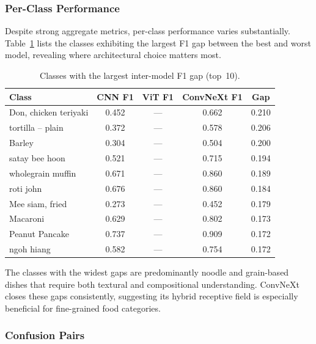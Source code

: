 \subsubsection{Per-Class Performance}\label{sec:per-class}

Despite strong aggregate metrics, per-class performance varies
substantially.  Table~\ref{tab:f1-gap} lists the classes exhibiting the
largest F1 gap between the best and worst model, revealing where
architectural choice matters most.

\begin{table}[ht]
\centering
\caption{Classes with the largest inter-model F1 gap (top~10).}
\label{tab:f1-gap}
\begin{tabular}{lcccc}
\toprule
\textbf{Class} & \textbf{CNN F1} & \textbf{ViT F1} & \textbf{ConvNeXt F1} & \textbf{Gap} \\
\midrule
Don, chicken teriyaki & 0.452 & ---   & 0.662 & 0.210 \\
tortilla -- plain     & 0.372 & ---   & 0.578 & 0.206 \\
Barley                & 0.304 & ---   & 0.504 & 0.200 \\
satay bee hoon        & 0.521 & ---   & 0.715 & 0.194 \\
wholegrain muffin     & 0.671 & ---   & 0.860 & 0.189 \\
roti john             & 0.676 & ---   & 0.860 & 0.184 \\
Mee siam, fried       & 0.273 & ---   & 0.452 & 0.179 \\
Macaroni              & 0.629 & ---   & 0.802 & 0.173 \\
Peanut Pancake        & 0.737 & ---   & 0.909 & 0.172 \\
ngoh hiang            & 0.582 & ---   & 0.754 & 0.172 \\
\bottomrule
\end{tabular}
\end{table}

The classes with the widest gaps are predominantly noodle and
grain-based dishes that require both textural and compositional
understanding.  ConvNeXt closes these gaps consistently, suggesting
its hybrid receptive field is especially beneficial for fine-grained
food categories.

\subsubsection{Confusion Pairs}\label{sec:confusion-pairs}

